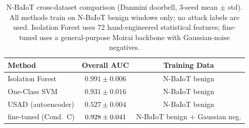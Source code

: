 \begin{table}[t]
\centering
\caption{%
  N-BaIoT cross-dataset comparison (Danmini doorbell, 3-seed mean $\pm$ std).
  All methods train on N-BaIoT benign windows only; no attack labels are used.
  Isolation Forest uses 72 hand-engineered statistical features;
  \ours{} fine-tuned uses a general-purpose Moirai backbone with Gaussian-noise negatives.
}
\label{tab:nbaiot_baselines}
\small
\begin{tabular}{@{}lcc@{}}
\toprule
Method & Overall AUC & Training Data \\
\midrule
Isolation Forest    & $0.991 \pm 0.006$ & N-BaIoT benign \\
One-Class SVM       & $0.931 \pm 0.016$ & N-BaIoT benign \\
USAD (autoencoder)  & $0.527 \pm 0.004$ & N-BaIoT benign \\
\midrule
\ours{} fine-tuned (Cond.~C) & $0.928{} \pm 0.041$ & N-BaIoT benign + Gaussian neg. \\
\bottomrule
\end{tabular}
\end{table}
